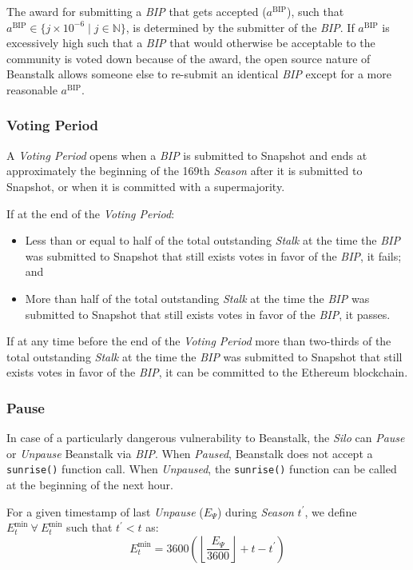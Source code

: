 \documentclass[tikz]{article}
\newcommand{\code}[1]{\texttt{#1}}
\newcommand{\term}[1]{\textsl{#1}}
\begin{document}
The award for submitting a \term{BIP} that gets accepted ($a^{\text{BIP}}$), such that $a^{\text{BIP}} \in \{j \times 10^{-6} \mid j \in \mathbb{N} \}$, is determined by the submitter of the \term{BIP}. If $a^{\text{BIP}}$ is excessively high such that a \term{BIP} that would otherwise be acceptable to the community is voted down because of the award, the open source nature of Beanstalk allows someone else to re-submit an identical \term{BIP} except for a more reasonable $a^{\text{BIP}}$.

\subsubsection{Voting Period}
\vspace*{-1mm}
A \term{Voting Period} opens when a \term{BIP} is submitted to Snapshot and ends at approximately the beginning of the 169th \term{Season} after it is submitted to Snapshot, or when it is committed with a supermajority.

If at the end of the \term{Voting Period}:
\begin{itemize}[midsep]
    \item Less than or equal to half of the total outstanding \term{Stalk} at the time the \term{BIP} was submitted to Snapshot that still exists votes in favor of the \term{BIP}, it fails; and
    \item More than half of the total outstanding \term{Stalk} at the time the \term{BIP} was submitted to Snapshot that still exists votes in favor of the \term{BIP}, it passes.
\end{itemize}

If at any time before the end of the \term{Voting Period} more than two-thirds of the total outstanding \term{Stalk} at the time the \term{BIP} was submitted to Snapshot that still exists votes in favor of the \term{BIP}, it can be committed to the Ethereum blockchain.

\subsubsection{Pause}
In case of a particularly dangerous vulnerability to Beanstalk, the \term{Silo} can \term{Pause} or \term{Unpause} Beanstalk via \term{BIP}. When \term{Paused}, Beanstalk does not accept a \code{sunrise()} function call. When \term{Unpaused}, the \code{sunrise()} function can be called at the beginning of the next hour.

For a given timestamp of last \term{Unpause} ($E_{\Psi}$) during \term{Season} $t^{'}$, we define $E_{t}^{\text{min}}\ \forall\ E_{t}^{\text{min}}$ such that $t^{'} < t$ as:
$$E_{t}^{\text{min}} = 3600{\left({\left\lfloor\frac{E_{\Psi}}{3600}\right\rfloor} + t - t^{'}\right)}$$
\end{document}
